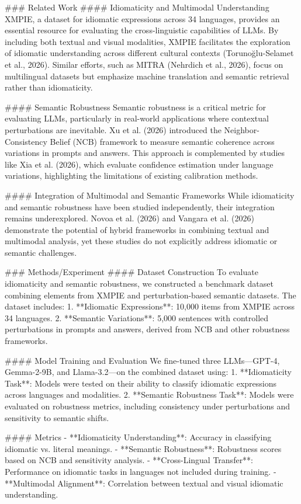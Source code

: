 ### Related Work
#### Idiomaticity and Multimodal Understanding
XMPIE, a dataset for idiomatic expressions across 34 languages, provides an essential resource for evaluating the cross-linguistic capabilities of LLMs. By including both textual and visual modalities, XMPIE facilitates the exploration of idiomatic understanding across different cultural contexts (Torunoğlu-Selamet et al., 2026). Similar efforts, such as MITRA (Nehrdich et al., 2026), focus on multilingual datasets but emphasize machine translation and semantic retrieval rather than idiomaticity.

#### Semantic Robustness
Semantic robustness is a critical metric for evaluating LLMs, particularly in real-world applications where contextual perturbations are inevitable. Xu et al. (2026) introduced the Neighbor-Consistency Belief (NCB) framework to measure semantic coherence across variations in prompts and answers. This approach is complemented by studies like Xia et al. (2026), which evaluate confidence estimation under language variations, highlighting the limitations of existing calibration methods.

#### Integration of Multimodal and Semantic Frameworks
While idiomaticity and semantic robustness have been studied independently, their integration remains underexplored. Novoa et al. (2026) and Vangara et al. (2026) demonstrate the potential of hybrid frameworks in combining textual and multimodal analysis, yet these studies do not explicitly address idiomatic or semantic challenges.

### Methods/Experiment
#### Dataset Construction
To evaluate idiomaticity and semantic robustness, we constructed a benchmark dataset combining elements from XMPIE and perturbation-based semantic datasets. The dataset includes:
1. **Idiomatic Expressions**: 10,000 items from XMPIE across 34 languages.
2. **Semantic Variations**: 5,000 sentences with controlled perturbations in prompts and answers, derived from NCB and other robustness frameworks.

#### Model Training and Evaluation
We fine-tuned three LLMs—GPT-4, Gemma-2-9B, and Llama-3.2—on the combined dataset using:
1. **Idiomaticity Task**: Models were tested on their ability to classify idiomatic expressions across languages and modalities.
2. **Semantic Robustness Task**: Models were evaluated on robustness metrics, including consistency under perturbations and sensitivity to semantic shifts.

#### Metrics
- **Idiomaticity Understanding**: Accuracy in classifying idiomatic vs. literal meanings.
- **Semantic Robustness**: Robustness scores based on NCB and sensitivity analysis.
- **Cross-Lingual Transfer**: Performance on idiomatic tasks in languages not included during training.
- **Multimodal Alignment**: Correlation between textual and visual idiomatic understanding.

